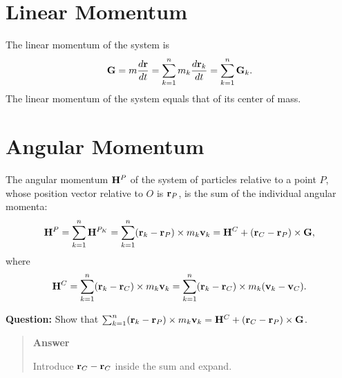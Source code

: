 \documentclass[
  letterpaper,
  DIV=11,
  numbers=noendperiod]{scrreprt}
\begin{document}
\section{Linear Momentum}\label{linear-momentum}

The linear momentum of the system is \begin{align}
    {\bf G} = m\frac{d{\bf r}}{dt} = \sum_{k=1}^n m_k\frac{d{\bf r}_k}{dt} = \sum_{k=1}^n{\bf G}_k.
\end{align} The linear momentum of the system equals that of its center
of mass.

\section{Angular Momentum}\label{angular-momentum}

The angular momentum \({\bf H}^P\) of the system of particles relative
to a point \(P\), whose position vector relative to \(O\) is
\({\bf r}_P\), is the sum of the individual angular momenta:
\begin{align}
    {\bf H}^P = \sum_{k=1}^n{\bf H}^{P_K} = \sum_{k=1}^n({\bf r}_k-{\bf r}_P)\times m_k{\bf v}_k = {\bf H}^C+({\bf r}_C-{\bf r}_P)\times{\bf G},
\end{align} where \begin{align}
    {\bf H}^C = \sum_{k=1}^n({\bf r}_k-{\bf r}_C)\times m_k{\bf v}_k = \sum_{k=1}^n({\bf r}_k-{\bf r}_C)\times m_k({\bf v}_k-{\bf v}_C).
\end{align}

\begin{tcolorbox}[enhanced jigsaw, arc=.35mm, bottomrule=.15mm, bottomtitle=1mm, breakable, colback=white, colbacktitle=quarto-callout-tip-color!10!white, colframe=quarto-callout-tip-color-frame, coltitle=black, left=2mm, leftrule=.75mm, opacityback=0, opacitybacktitle=0.6, rightrule=.15mm, title=\textcolor{quarto-callout-tip-color}{\faLightbulb}\hspace{0.5em}{Think!}, titlerule=0mm, toprule=.15mm, toptitle=1mm]

\textbf{Question:} Show that
\(\sum_{k=1}^n({\bf r}_k-{\bf r}_P)\times m_k{\bf v}_k = {\bf H}^C+({\bf r}_C-{\bf r}_P)\times{\bf G}\).

\begin{quote}
\textbf{Answer}

Introduce \({\bf r}_C-{\bf r}_C\) inside the sum and expand.
\end{quote}

\end{tcolorbox}
\end{document}
